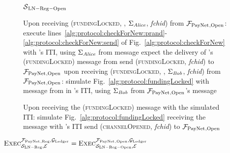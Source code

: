 \begin{figure}[H]
\begin{simulatorbox}{$\mathcal{S}{}_{\mathrm{LN - Reg - Open}}$}
\begin{algorithmic}[1]
      \State Upon receiving (\textsc{fundingLocked}, \alice, $\Sigma_{\mathit{Alice}}$,
      \textit{fchid}) from $\mathcal{F}_{\mathrm{PayNet}}{}_{\mathrm{, Open}}$:
      \Indent
        \State execute
        lines~\ref{alg:protocol:checkForNew:prand}-\ref{alg:protocol:checkForNew:send}
        of Fig.~\ref{alg:protocol:checkForNew} with \alice's ITI, using
        $\Sigma_{\mathit{Alice}}$ from message
        \label{alg:sim:fundingLocked:sim:alice}
          \State expect the delivery of \alice's (\textsc{fundingLocked})
          message from \adversary
          \State send (\textsc{fundingLocked}, \textit{fchid}) to
          $\mathcal{F}_{\mathrm{PayNet}}{}_{\mathrm{, Open}}$
          \State upon receiving (\textsc{fundingLocked}, \bob, $\Sigma_{\mathit{Bob}}$,
          \textit{fchid}) from $\mathcal{F}_{\mathrm{PayNet}}{}_{\mathrm{, Open}}$:
          \State simulate Fig.~\ref{alg:protocol:fundingLocked} with message
          from \alice{} in \bob's ITI, using $\Sigma_{\mathit{Bob}}$ from
          $\mathcal{F}_{\mathrm{PayNet}}{}_{\mathrm{, Open}}$'s message
          \label{alg:sim:fundingLocked:sim:bob}
        \EndIf
      \EndIndent
      \Statex

      \State Upon receiving the (\textsc{fundingLocked}) message with the
      simulated \alice{} ITI:
      \Indent
        \State simulate Fig.~\ref{alg:protocol:fundingLocked} receiving
        the message with \alice's ITI
        \State send (\textsc{channelOpened}, \textit{fchid}) to
        $\mathcal{F}_{\mathrm{PayNet}}{}_{\mathrm{, Open}}$
        \label{alg:sim:open:channelOpened}
      \EndIndent
    \end{algorithmic}
  \end{simulatorbox}
  \caption{}
  \label{alg:sim:open}
\end{figure}

\begin{lemma}
  \label{lemma:open}
  $\textsc{Exec}^{\mathcal{F}_{\mathrm{PayNet}}{}_{\mathrm{, Reg}},
  \mathcal{G}_{\mathrm{Ledger}}}_{\mathcal{S}_{\mathrm{LN - Reg}}, \mathcal{E}} =
  \textsc{Exec}^{\mathcal{F}_{\mathrm{PayNet}}{}_{\mathrm{, Open}},
  \mathcal{G}_{\mathrm{Ledger}}}_{\mathcal{S}_{\mathrm{LN - Reg - Open}}, \mathcal{E}}$
\end{lemma}


